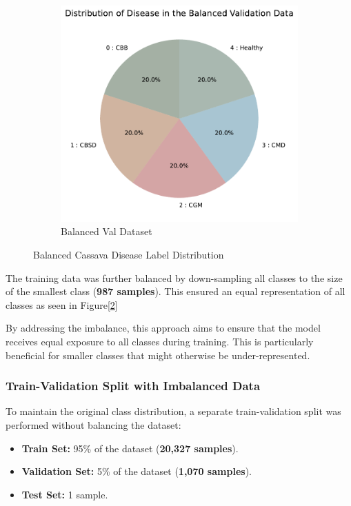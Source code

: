 \begin{figure}[t]
\begin{subfigure}{0.4\textwidth}
        \includegraphics[width=\linewidth]{graphs/overview/Distribution of Disease in the Balanced Validation Data.pdf}
        \caption{Balanced Val Dataset}
        \label{fig:BalancedVal}
    \end{subfigure}
    \caption{Balanced Cassava Disease Label Distribution}
    \label{fig:BalancedDataset}
\end{figure}

The training data was further balanced by down-sampling all classes to the size of the smallest class (\textbf{987 samples}). This ensured an equal representation of all classes as seen in Figure[\ref{fig:BalancedDataset}]

By addressing the imbalance, this approach aims to ensure that the model receives equal exposure to all classes during training. This is particularly beneficial for smaller classes that might otherwise be under-represented.

\subsubsection{Train-Validation Split with Imbalanced Data}
To maintain the original class distribution, a separate train-validation split was performed without balancing the dataset:

\begin{itemize}
    \item \textbf{Train Set:} 95\% of the dataset (\textbf{20,327 samples}).
    \item \textbf{Validation Set:} 5\% of the dataset (\textbf{1,070 samples}).
    \item \textbf{Test Set:} 1 sample.
\end{itemize}

